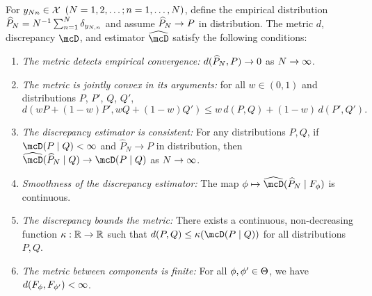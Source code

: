 \begin{assumption} 	\label{assump:metric-discr-conditions}
	For $y_{N n} \in \mathcal{X}$ $(N = 1,2,\dots; n = 1,\dots,N)$,
	define the empirical distribution $\widehat{P}_{N} = N^{-1}\sum_{n=1}^{N}\delta_{y_{N,n}}$
	and assume $\widehat{P}_{N} \rightarrow P$ in distribution.
	The metric $d$, discrepancy $\mcD$, and estimator $\widehat{\mcD}$ satisfy the following conditions:
	\begin{enumerate}[label=\textnormal{(\alph*)}]
		\item \emph{The metric detects empirical convergence:} $d(\widehat{P}_N, P) \to 0$ as $N \to \infty$.
		\item  \emph{The metric is jointly convex in its arguments:} for all $w \in (0, 1)$ and distributions $P$, $P'$, $Q$, $Q'$,
		      \[
			      d(wP + (1 - w)P', wQ + (1 - w)Q') \le w\,d(P, Q) + (1 - w)\,d(P', Q').
		      \]
		\item  \emph{The discrepancy estimator is consistent:} For any distributions $P, Q$,
		      if $\discr{P}{Q} < \infty$ and $\widehat P_{N} \to P$ in distribution,
		      then $\discrest{\widehat{P}_{\numobs}}{Q} \to \discr{P}{Q}$ as $N \to \infty$.
		\item \emph{Smoothness of the discrepancy estimator:} The map $\param \mapsto \discrest{\widehat{P}_{\numobs}}{F_{\param}}$ is continuous.
		\item  \emph{The discrepancy bounds the metric:} There exists a continuous,
		      non-decreasing function $\kappa: \mathbb{R} \to \mathbb{R}$ such that
		      $d(P,Q) \leq \kappa(\discr{P}{Q})$ for all distributions $P, Q$.
		\item \emph{The metric between components is finite:} For all $\phi, \phi' \in \Theta$,
		      we have $d(F_{\phi}, F_{\phi'}) < \infty$.
	\end{enumerate}
\end{assumption}

